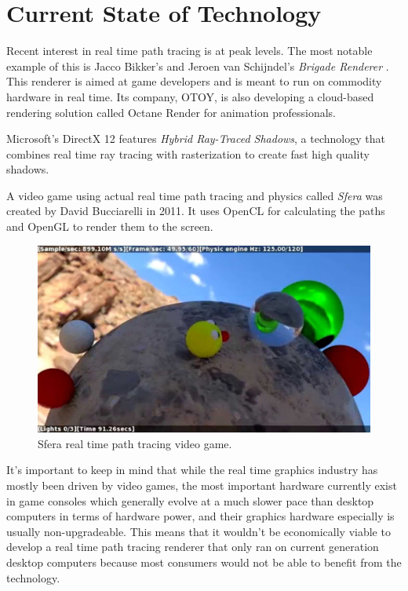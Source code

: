 \documentclass[
  twoside,
  11pt, a4paper,
  footinclude=true,
  headinclude=true,
  cleardoublepage=empty
]{scrreprt}
\begin{document}
\section{Current State of Technology}
Recent interest in real time path tracing is at peak levels. The most notable
example of this is Jacco Bikker's and Jeroen van Schijndel's \emph{Brigade Renderer} \cite{article:brigade}
\cite{site:brigade}. This renderer is aimed at game developers and is meant to run on commodity
hardware in real time. Its company, OTOY, is also developing a cloud-based rendering solution
called Octane Render \cite{site:octane} for animation professionals.

Microsoft's DirectX 12 \cite{site:dx12-raytracing} features \emph{Hybrid Ray-Traced Shadows}, a
technology that combines real time ray tracing with rasterization to create fast high quality
shadows.

A video game using actual real time path tracing and physics called \emph{Sfera} was created by
David Bucciarelli \cite{site:sfera} in 2011. It uses OpenCL for calculating the paths and OpenGL to
render them to the screen.

\begin{figure}[H]
    \includegraphics[scale=0.32]{sfera}
    \centering
    \caption{Sfera real time path tracing video game.}
    \label{fig:sfera}
\end{figure}

It's important to keep in mind that while the real time graphics industry has mostly been driven by
video games, the most important hardware currently exist in game consoles which generally evolve at
a much slower pace than desktop computers in terms of hardware power, and their graphics hardware
especially is usually non-upgradeable. This means that it wouldn't be economically viable to
develop a real time path tracing renderer that only ran on current generation desktop computers
because most consumers would not be able to benefit from the technology.
\end{document}
